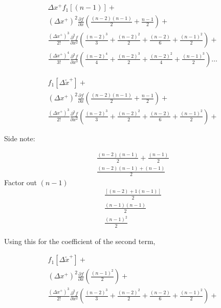 \begin{align*}
    \Delta x^+ f_1\left[ (n - 1)  \right] + \\
    (\Delta x^+)^2 \frac{\partial f}{\partial x } \left(
    \frac{(n-2)\left( n-1 \right)}{2} + \frac{n-1}{2} \right) + \\
        \frac{(\Delta x^+)^3}{2!} \frac{\partial^2 f}{\partial x^2 } \left(
        \frac{(n-2)^3}{3} + \frac{(n-2)^2}{2} + \frac{(n-2)}{6} + \frac{(n-1)^2}{2} \right)  + \\
    \frac{(\Delta x^+)^4}{3!} \frac{\partial^3 f}{\partial x^3 } \left(
    \frac{(n-2)^4}{4} + \frac{(n-2)^3}{2} + \frac{(n-2)^2}{4} + \frac{(n-1)^3}{2} \right) \dots
\end{align*}

\begin{align*}
     f_1\left[ \Delta \widetilde{x}^+  \right] + \\
    (\Delta x^+)^2 \frac{\partial f}{\partial x } \left(
    \frac{(n-2)\left( n-1 \right)}{2} + \frac{n-1}{2} \right) + \\
        \frac{(\Delta x^+)^3}{2!} \frac{\partial^2 f}{\partial x^2 } \left(
        \frac{(n-2)^3}{3} + \frac{(n-2)^2}{2} + \frac{(n-2)}{6} + \frac{(n-1)^2}{2} \right)  + 
\end{align*}

Side note: 

\begin{align*}
    \frac{(n - 2)(n-1)}{2} + \frac{(n-1)}{2}\\
    \frac{(n - 2)(n-1) + (n-1)}{2} 
\end{align*}
Factor out $(n-1)$
\begin{align*}
    \frac{\left[ \left( n - 2 \right) + 1 \left( n - 1 \right) \right]}{2} \\
    \frac{\left( n-1 \right)\left( n - 1 \right)}{2} \\
    \frac{\left( n - 1 \right)^2}{2}
\end{align*}

Using this for the coefficient of the second term,

\begin{align*}
     f_1\left[ \Delta \widetilde{x}^+  \right] + \\
    (\Delta x^+)^2 \frac{\partial f}{\partial x } \left(
    \frac{(n-1)^2}{2}  \right) + \\
        \frac{(\Delta x^+)^3}{2!} \frac{\partial^2 f}{\partial x^2 } \left(
        \frac{(n-2)^3}{3} + \frac{(n-2)^2}{2} + \frac{(n-2)}{6} + \frac{(n-1)^2}{2} \right)  +
\end{align*}

